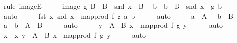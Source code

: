 \begin{isabellebody}
\ {\isacharparenleft}{\kern0pt}rule\ imageE{\isacharparenright}{\kern0pt}\isanewline
\ \ \isamarkupfalse%
\ \isamarkupfalse%
\ {\isacartoucheopen}image\ g\ B\ {\isacharequal}{\kern0pt}\ B{\isacharprime}{\kern0pt}{\isacartoucheclose}\ \ {\isacartoucheopen}snd\ x\ {\isasymin}\ B{\isacharprime}{\kern0pt}{\isacartoucheclose}\ \isamarkupfalse%
\ b\ \ {\isachardoublequoteopen}b\ {\isasymin}\ B{\isachardoublequoteclose}\ \ {\isachardoublequoteopen}snd\ x\ {\isacharequal}{\kern0pt}\ g\ b{\isachardoublequoteclose}\isanewline
\ \ \ \ \isamarkupfalse%
\ auto\isanewline
\ \ \isamarkupfalse%
\ \isamarkupfalse%
\ {\isachardoublequoteopen}{\isacharparenleft}{\kern0pt}fst\ x{\isacharcomma}{\kern0pt}\ snd\ x{\isacharparenright}{\kern0pt}\ {\isacharequal}{\kern0pt}\ map{\isacharunderscore}{\kern0pt}prod\ f\ g\ {\isacharparenleft}{\kern0pt}a{\isacharcomma}{\kern0pt}\ b{\isacharparenright}{\kern0pt}{\isachardoublequoteclose}\isanewline
\ \ \ \ \isamarkupfalse%
\ auto\isanewline
\ \ \isamarkupfalse%
\ \isamarkupfalse%
\ {\isacartoucheopen}a\ {\isasymin}\ A{\isacartoucheclose}\ \ \ {\isacartoucheopen}b\ {\isasymin}\ B{\isacartoucheclose}\ \isamarkupfalse%
\ {\isachardoublequoteopen}{\isacharparenleft}{\kern0pt}a\ {\isacharcomma}{\kern0pt}\ b{\isacharparenright}{\kern0pt}\ {\isasymin}\ A\ {\isasymtimes}\ B{\isachardoublequoteclose}\isanewline
\ \ \ \ \isamarkupfalse%
\ auto\isanewline
\ \ \isamarkupfalse%
\ \isamarkupfalse%
\ {\isachardoublequoteopen}{\isasymexists}y\ {\isasymin}\ A\ {\isasymtimes}\ B{\isachardot}{\kern0pt}\ x\ {\isacharequal}{\kern0pt}\ map{\isacharunderscore}{\kern0pt}prod\ f\ g\ y{\isachardoublequoteclose}\isanewline
\ \ \ \ \isamarkupfalse%
\ auto\isanewline
\ \ \isamarkupfalse%
\ \isamarkupfalse%
\ {\isachardoublequoteopen}x\ {\isasymin}\ {\isacharbraceleft}{\kern0pt}x{\isachardot}{\kern0pt}\ {\isasymexists}y\ {\isasymin}\ A\ {\isasymtimes}\ B{\isachardot}{\kern0pt}\ x\ {\isacharequal}{\kern0pt}\ map{\isacharunderscore}{\kern0pt}prod\ f\ g\ y{\isacharbraceright}{\kern0pt}{\isachardoublequoteclose}\isanewline
\ \ \ \ \isamarkupfalse%
\ auto\isanewline
{}\isamarkupfalse%
%
\endisatagproof
{\isafoldproof}%
%
\isadelimproof
%
\endisadelimproof
%
\isadelimdocument
%
\endisadelimdocument

\end{isabellebody}

